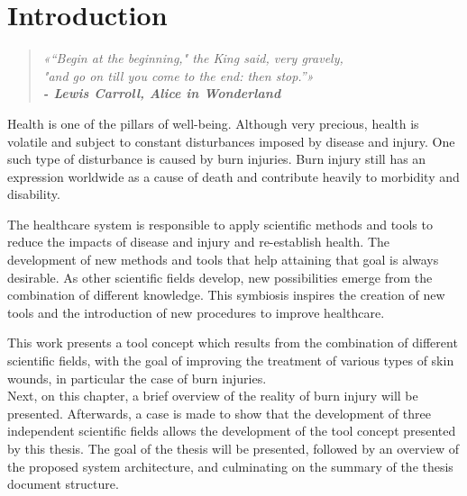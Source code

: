 \newcommand{\novathesis}{\emph{novathesis}}
\newcommand{\novathesisclass}{\texttt{novathesis.cls}}


\chapter{Introduction}
\label{cha:introduction}

\begin{quotation}
\begin{flushright}
\itshape
«“Begin at the beginning," the King said, very gravely, \\"and go on till you come to the end: then stop.”»\\
\textbf{- Lewis Carroll, Alice in Wonderland}
\end{flushright}
\end{quotation}

Health is one of the pillars of well-being. Although very precious, health is volatile and subject to constant disturbances imposed by disease and injury. One such type of disturbance is caused by burn injuries. Burn injury still has an expression worldwide as a cause of death and contribute heavily to morbidity and disability.

The healthcare system is responsible to apply scientific methods and tools to reduce the impacts of disease and injury and re-establish health. The development of new methods and tools that help attaining that goal is always desirable. As other scientific fields develop, new possibilities emerge from the combination of different knowledge. This symbiosis inspires the creation of new tools and the introduction of new procedures to improve healthcare.

This work presents a tool concept which results from the combination of different scientific fields, with the goal of improving the treatment of various types of skin wounds, in particular the case of burn injuries.\\

Next, on this chapter, a brief overview of the reality of burn injury will be presented. Afterwards, a case is made to show that the development of three independent scientific fields allows the development of the tool concept presented by this thesis. The goal of the thesis will be presented, followed by an overview of the proposed system architecture, and culminating on the summary of the thesis document structure.

